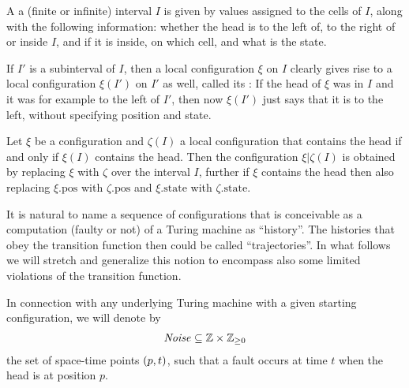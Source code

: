 \documentclass[12pt]{memoir}
\renewcommand{\ge}{\geq}
\newcommand{\Noise}{\mathit{Noise}}
\newcommand{\pos}{\mathrm{pos}}
\newcommand{\state}{\mathrm{state}}
\begin{document}
\begin{definition}
\label{def:local-config}
  A  a (finite or infinite)
  interval \( I \) is given by values assigned to the cells
  of \( I \), along with the following information: whether
  the head is to the left of, to the right of or inside
  \( I \), and if it is inside, on which cell, and what is
  the state.

  If \( I' \) is a subinterval of \( I \), then a local configuration
  \( \xi \) on \( I \) clearly gives rise to a local configuration
  \( \xi(I') \) on \( I' \) as well, called its
  : If the head of \( \xi \) was in \( I \)
  and it was for example to the left of \( I' \), then now
  \( \xi(I') \) just says that it is to the left, without
  specifying position and state.

  Let \( \xi \) be a configuration and \( \zeta(I) \) a local
  configuration that contains the head if and only if
  \( \xi(I) \) contains the head.
  Then the configuration \( \xi\vert\zeta(I) \) is obtained by
  replacing \( \xi \) with \( \zeta \) over the interval \( I \),
  further if \( \xi \) contains the head then also replacing
  \( \xi.\pos \) with \( \zeta.\pos \) and \( \xi.\state \) with
  \( \zeta.\state \).
\end{definition}



It is natural to name a sequence of configurations that is conceivable as a computation
(faulty or not) of a Turing machine as ``history''.
The histories that obey the transition function then could be called ``trajectories''.
In what follows we will 
stretch and generalize this notion to encompass also some limited violations of the
transition function.

In connection with any underlying Turing machine with a given starting configuration, we will
denote by
\begin{align}\label{eq:noise-first}
   \Noise\subseteq \bbZ\times \bbZ_{\ge 0}
\end{align}
the set of space-time points \( (p,t) \), such that
a fault occurs at time \( t \) when the head is at position \( p \).
\end{document}
